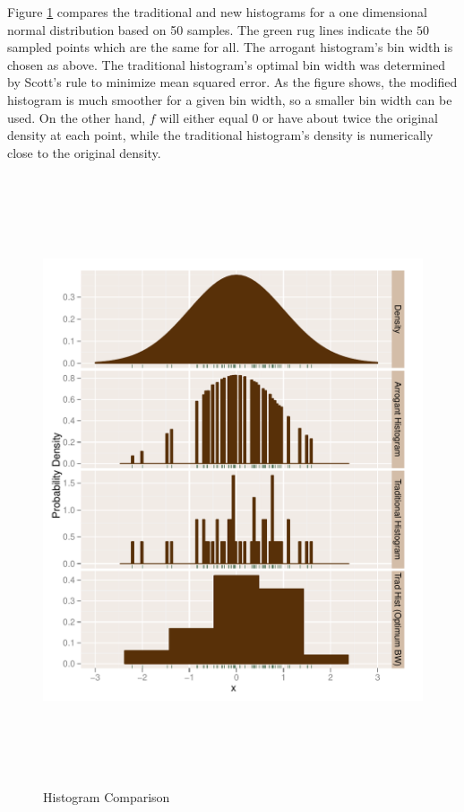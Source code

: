 \documentclass[letterpaper,12pt]{article}
\begin{document}
Figure \ref{histograms} compares the traditional and new histograms
for a one dimensional normal distribution based on 50 samples.  The
green rug lines indicate the $50$ sampled points which are the same
for all.  The arrogant histogram's bin width is chosen as above.  The
traditional histogram's optimal bin width was determined by Scott's
rule to minimize mean squared error.  As the figure shows, the
modified histogram is much smoother for a given bin width, so a
smaller bin width can be used.  On the other hand, $f$ will either
equal 0 or have about twice the original density at each point, while
the traditional histogram's density is numerically close to the
original density.

\begin{figure}\begin{center}\includegraphics[width=15.5cm,height=18cm]{favir-graphs/hist_plot.pdf}\caption{Histogram Comparison}\label{histograms}\end{center}\end{figure}
\end{document}
